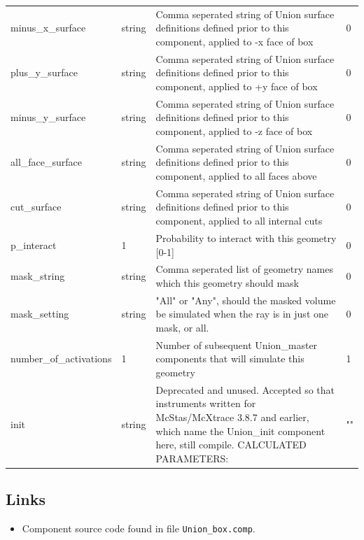 \begin{longtable}{p{}p{}p{}p{}}
minus\_x\_surface & string & Comma seperated string of Union surface definitions defined prior to this component, applied to -x face of box & 0 \\
plus\_y\_surface & string & Comma seperated string of Union surface definitions defined prior to this component, applied to +y face of box & 0 \\
minus\_y\_surface & string & Comma seperated string of Union surface definitions defined prior to this component, applied to -z face of box & 0 \\
all\_face\_surface & string & Comma seperated string of Union surface definitions defined prior to this component, applied to all faces above & 0 \\
cut\_surface & string & Comma seperated string of Union surface definitions defined prior to this component, applied to all internal cuts & 0 \\
p\_interact & 1 & Probability to interact with this geometry [0-1] & 0 \\
mask\_string & string & Comma seperated list of geometry names which this geometry should mask & 0 \\
mask\_setting & string & "All" or "Any", should the masked volume be simulated when the ray is in just one mask, or all. & 0 \\
number\_of\_activations & 1 & Number of subsequent Union\_master components that will simulate this geometry & 1 \\
init & string & Deprecated and unused. Accepted so that instruments written for McStas/McXtrace 3.8.7 and earlier, which name the Union\_init component here, still compile. CALCULATED PARAMETERS: & "" \\
\bottomrule
\end{longtable}

\subsection*{Links}
\begin{itemize}
  \item Component source code found in file \texttt{Union\_box.comp}.
\end{itemize}

